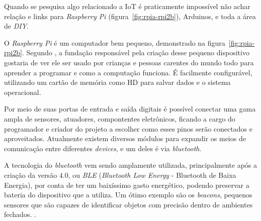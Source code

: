 \documentclass[
	12pt,				%
	openright,			%
	oneside,			%
	a4paper,			%
	chapter=TITLE,		%
	english,			%
	french,				%
	spanish,			%
	brazil				%
	]{abntex2}
\begin{document}
{Quando se pesquisa algo relacionado a IoT é praticamente impossível não achar relação e links para \textit{Raspberry Pi} (figura~\ref{fig:rpia-rpi2b}), Arduinos, e toda a área de \textit{DIY}. 


		\begin{figure}[h!]
		\end{figure}

O \textit{Raspberry Pi} é um computador bem pequeno, demonstrado na figura~\ref{fig:rpia-rpi2b}. Segundo , a fundação responsável pela criação desse pequeno dispositivo gostaria de ver ele ser usado por crianças e pessoas carentes do mundo todo para aprender a programar e como a computação funciona. É facilmente configurável, utilizando um cartão de memória como HD para salvar dados e o sistema operacional.

Por meio de suas portas de entrada e saída digitais é possível conectar uma gama ampla de sensores, atuadores, compontentes eletrônicos, ficando a cargo do programador e criador do projeto a escolher como esses pinos serão conectados e aproveitados. Atualmente existem diversos módulos para expandir os meios de comunicação entre diferentes \textit{devices}, e um deles é via \textit{bluetooth}.

A tecnologia do \textit{bluetooth} vem sendo amplamente utilizada, principalmente após a criação da versão 4.0, ou \textit{BLE} (\textit{Bluetooth Low Energy} - Bluetooth de Baixa Energia), por conta de ter um baixíssimo gasto energético, podendo preservar a bateria do dispositivo que a utiliza. Um ótimo exemplo são os \textit{beacons}, pequenos sensores que são capazes de identificar objetos com precisão dentro de ambientes fechados. \cite{teixeira-beacon}.

}
\end{document}
